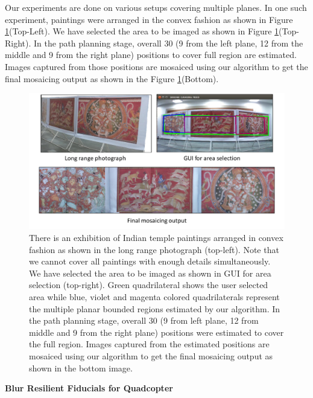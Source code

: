 Our experiments are done on various setups covering multiple planes.
In one such experiment, paintings were arranged in the convex
fashion as shown in Figure \ref{fig:multiplanar_result}(Top-Left). We have selected
the area to be imaged as shown in Figure \ref{fig:multiplanar_result}(Top-Right). In
the path planning stage, overall 30 (9 from the left plane, 12 from the middle
and 9 from the right plane) positions to cover full region are estimated.  Images
captured from those positions are mosaiced using our algorithm to get the final
mosaicing output as shown in the Figure \ref{fig:multiplanar_result}(Bottom).
\begin{figure}[h!]
	\centering
	\includegraphics[width=0.98\linewidth]{figures/multiplanar/convexResult}
	\caption[Result: Imaging Convex Surface ]{There is an exhibition of Indian
	temple paintings arranged in convex fashion as shown in the long range photograph (top-left). Note that we
cannot cover all paintings with enough details simultaneously. We have selected
the area to be imaged as shown in GUI for area selection (top-right).
Green quadrilateral shows the user selected area while blue, violet and magenta
colored quadrilaterals represent the multiple planar bounded regions
estimated by our algorithm. In the path planning stage, overall 30 (9 from left
plane, 12 from middle and 9 from the right plane) positions were estimated to cover
the full region. Images captured from the estimated positions are mosaiced using
our algorithm to get the final mosaicing output as shown in the bottom image.}	
	\label{fig:multiplanar_result}
\end{figure}
	
\noindent \textbf{Blur Resilient Fiducials for Quadcopter}\\

